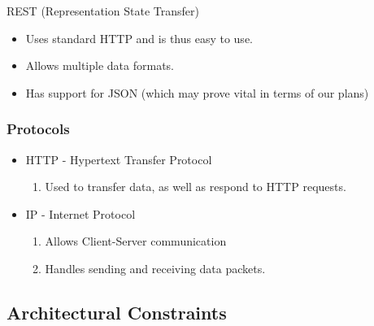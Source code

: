 \documentclass[hidelinks,a4paper,12pt]{article}
\begin{document}
	REST (Representation State Transfer)
	\begin{itemize}
		\item Uses standard HTTP and is thus easy to use.
		\item Allows multiple data formats.
		\item Has support for JSON (which may prove vital in terms of our plans)
	\end{itemize}
	
	\subsubsection{Protocols}
	\begin{itemize}
		\item HTTP - Hypertext Transfer Protocol
		\begin{enumerate}
			\item Used to transfer data, as well as respond to HTTP requests.
		\end{enumerate}
		\item IP - Internet Protocol
		\begin{enumerate}
			\item Allows Client-Server communication
			\item Handles sending and receiving data packets.
		\end{enumerate}
	\end{itemize}
	
\subsection{Architectural Constraints}
\end{document}
